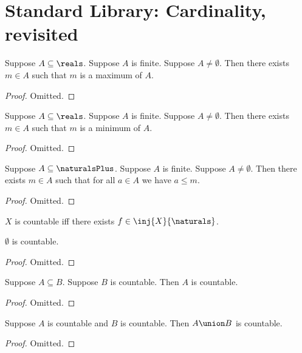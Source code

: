 \section{Standard Library: Cardinality, revisited} 

\begin{lemma}\label{finite_real_maximum}
    Suppose $A\subseteq\reals$.
    Suppose $A$ is finite.
    Suppose $A\neq \emptyset$.
    Then there exists $m\in A$ such that $m$ is a maximum of $A$.
\end{lemma}
\begin{proof}
    Omitted.
\end{proof}

\begin{lemma}\label{finite_real_minimum}
    Suppose $A\subseteq\reals$.
    Suppose $A$ is finite.
    Suppose $A\neq \emptyset$.
    Then there exists $m\in A$ such that $m$ is a minimum of $A$.
\end{lemma}
\begin{proof}
    Omitted.
\end{proof}

\begin{lemma}\label{finite_naturals_maximum}
    Suppose $A\subseteq\naturalsPlus$.
    Suppose $A$ is finite.
    Suppose $A\neq \emptyset$.
    Then there exists $m\in A$ such that for all $a\in A$ we have $a \leq m$.
\end{lemma}
\begin{proof}
    Omitted.
\end{proof}

\begin{definition}\label{countable}
    $X$ is countable iff there exists $f\in\inj{X}{\naturals}$.
\end{definition}

\begin{lemma}\label{emptyset_is_countable}
    $\emptyset$ is countable.
\end{lemma}
\begin{proof}
   Omitted.
\end{proof}

\begin{lemma}\label{subseteq_countable_is_countable}
    Suppose $A\subseteq B$.
    Suppose $B$ is countable.
    Then $A$ is countable.
\end{lemma}
\begin{proof}
    Omitted.
\end{proof}

\begin{lemma}\label{union_of_countable_is_countable}
    Suppose $A$ is countable and $B$ is countable.
    Then $A\union B$ is countable.
\end{lemma}
\begin{proof}
    Omitted.
\end{proof}


